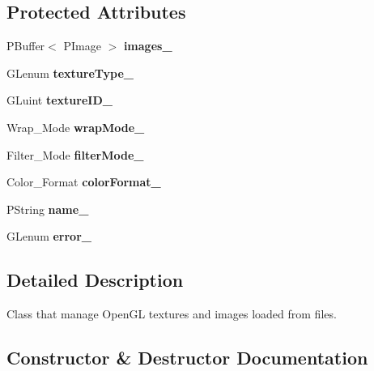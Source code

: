 \subsection*{Protected Attributes}
\begin{DoxyCompactItemize}
\item 
\mbox{\label{classprz_1_1_texture_a55c40d63f2d7591a3e603e32bf3fe415}} 
P\+Buffer$<$ P\+Image $>$ {\bfseries images\+\_\+}
\item 
\mbox{\label{classprz_1_1_texture_ab37b08a44286d475e0a206d839c050f9}} 
G\+Lenum {\bfseries texture\+Type\+\_\+}
\item 
\mbox{\label{classprz_1_1_texture_ac217dbee62c06d36880515b8a5c65b24}} 
G\+Luint {\bfseries texture\+I\+D\+\_\+}
\item 
\mbox{\label{classprz_1_1_texture_ad8280431126e0b96d8913ca48f800151}} 
Wrap\+\_\+\+Mode {\bfseries wrap\+Mode\+\_\+}
\item 
\mbox{\label{classprz_1_1_texture_a91911b6f58e86957b86d639e82ed64bf}} 
Filter\+\_\+\+Mode {\bfseries filter\+Mode\+\_\+}
\item 
\mbox{\label{classprz_1_1_texture_a81b73f3eaf14fbec1c8869aa996e2b19}} 
Color\+\_\+\+Format {\bfseries color\+Format\+\_\+}
\item 
\mbox{\label{classprz_1_1_texture_ad77fb2cfaadc2d54dfc8061e8d775627}} 
P\+String {\bfseries name\+\_\+}
\item 
\mbox{\label{classprz_1_1_texture_a620bea0d596614fcacb42456fb78211c}} 
G\+Lenum {\bfseries error\+\_\+}
\end{DoxyCompactItemize}


\subsection{Detailed Description}
Class that manage Open\+GL textures and images loaded from files. 



\subsection{Constructor \& Destructor Documentation}
\mbox{\label{classprz_1_1_texture_af46d7713d680b9771f3a43c552ee7b25}} 
